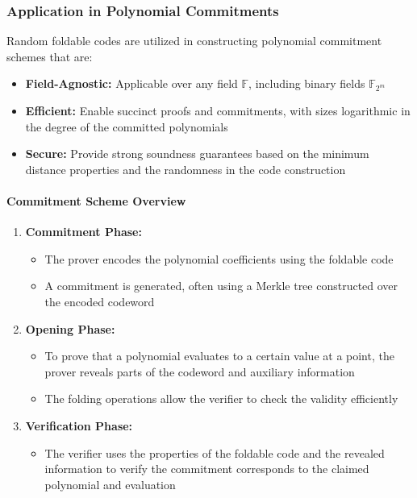 \documentclass{article}
\theoremstyle{plain}
\theoremstyle{definition}
\theoremstyle{remark}
\theoremstyle{problem}
\begin{document}
\subsubsection{Application in Polynomial Commitments}

Random foldable codes are utilized in constructing polynomial commitment schemes that are:
\begin{itemize}
    \item \textbf{Field-Agnostic:} Applicable over any field $\mathbb{F}$, including binary fields $\mathbb{F}_{2^m}$
    \item \textbf{Efficient:} Enable succinct proofs and commitments, with sizes logarithmic in the degree of the committed polynomials
    \item \textbf{Secure:} Provide strong soundness guarantees based on the minimum distance properties and the randomness in the code construction
\end{itemize}

\paragraph{Commitment Scheme Overview}

\begin{enumerate}
    \item \textbf{Commitment Phase:}
    \begin{itemize}
        \item The prover encodes the polynomial coefficients using the foldable code
        \item A commitment is generated, often using a Merkle tree constructed over the encoded codeword
    \end{itemize}

    \item \textbf{Opening Phase:}
    \begin{itemize}
        \item To prove that a polynomial evaluates to a certain value at a point, the prover reveals parts of the codeword and auxiliary information
        \item The folding operations allow the verifier to check the validity efficiently
    \end{itemize}

    \item \textbf{Verification Phase:}
    \begin{itemize}
        \item The verifier uses the properties of the foldable code and the revealed information to verify the commitment corresponds to the claimed polynomial and evaluation
    \end{itemize}
\end{enumerate}
\end{document}
